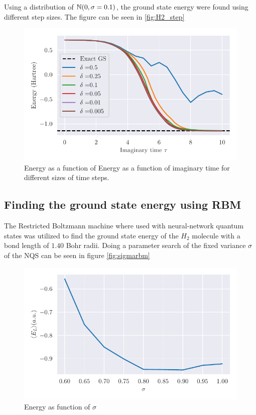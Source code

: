 \documentclass[../main.tex]{subfiles}
\begin{document}
Using a distribution of $\mathbb{N}(0,\sigma=0.1)$, the ground state energy were found using different step sizes. The figure can be seen in \autoref{fig:H2_step}

\begin{figure}
    \begin{center}
        \includegraphics{figures/energy_H2_search_N01.pdf}
        \caption{Energy as a function of Energy as a function of imaginary time for different sizes of time steps.}
        \label{fig:H2_step}
    \end{center}
\end{figure}
\subsection{Finding the ground state energy using RBM}
The Restricted Boltzmann machine where used with neural-network quantum states was utilized to find the ground state energy of the $H_2$ molecule with a bond length of $1.40$ Bohr radii. Doing a parameter search of the fixed variance $\sigma$ of the NQS can be seen in figure \autoref{fig:sigmarbm}

\begin{figure}
    \begin{center}
        \includegraphics{figures/sigma_investigation.pdf}
        \caption{Energy as function of $\sigma$}
        \label{fig:sigmarbm}
    \end{center}
\end{figure}
\end{document}
